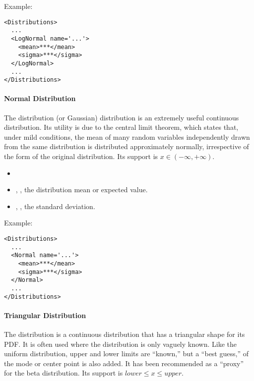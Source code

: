 Example:
\begin{lstlisting}[style=XML]
<Distributions>
  ...
  <LogNormal name='...'>
    <mean>***</mean>
    <sigma>***</sigma>
  </LogNormal>
  ...
</Distributions>
\end{lstlisting}

\paragraph{Normal Distribution}
\label{Normal}
The  distribution (or Gaussian) distribution is an extremely
useful continuous distribution.
Its utility is due to the central limit theorem, which states that, under mild
conditions, the mean of many random variables independently drawn from the same
distribution is distributed approximately normally, irrespective of the form of
the original distribution.
%
Its support is $x \in (-\infty, +\infty)$.

%
\attrIntro
\vspace{-5mm}
\begin{itemize}
\itemsep0em
\item \nameDescription
\end{itemize}
\vspace{-5mm}
\subnodesIntro
\begin{itemize}
\item {}, , the distribution mean
  or expected value.
\item {}, , the standard
  deviation.
\end{itemize}

Example:
\begin{lstlisting}[style=XML]
<Distributions>
  ...
  <Normal name='...'>
    <mean>***</mean>
    <sigma>***</sigma>
  </Normal>
  ...
</Distributions>
\end{lstlisting}

\paragraph{Triangular Distribution}
\label{Triangular}
The  distribution is a continuous distribution that has a
triangular shape for its PDF.
%
It is often used where the distribution is only vaguely known.
%
Like the uniform distribution, upper and lower limits are ``known,'' but a 
``best guess,'' of the mode or center point is also added.
%
It has been recommended as a ``proxy'' for the beta distribution.
%
Its support is $lower \le x \le upper$.

